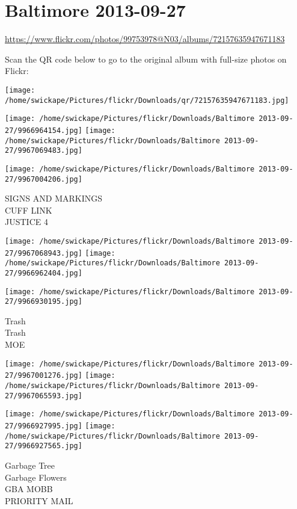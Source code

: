 \documentclass[10pt,letterpaper]{article}
\title{}
\author{}
\date{}
\begin{document}
\section*{Baltimore 2013-09-27}

\url{https://www.flickr.com/photos/99753978@N03/albums/72157635947671183}

Scan the QR code below to go to the original album with full-size photos on Flickr:

\texttt{[image: /home/swickape/Pictures/flickr/Downloads/qr/72157635947671183.jpg]}
\pagebreak

\texttt{[image: /home/swickape/Pictures/flickr/Downloads/Baltimore 2013-09-27/9966964154.jpg]}
\texttt{[image: /home/swickape/Pictures/flickr/Downloads/Baltimore 2013-09-27/9967069483.jpg]}

\vspace{0.25in}
\texttt{[image: /home/swickape/Pictures/flickr/Downloads/Baltimore 2013-09-27/9967004206.jpg]}

SIGNS AND MARKINGS\\
CUFF LINK\\
JUSTICE 4
\pagebreak

\texttt{[image: /home/swickape/Pictures/flickr/Downloads/Baltimore 2013-09-27/9967068943.jpg]}
\texttt{[image: /home/swickape/Pictures/flickr/Downloads/Baltimore 2013-09-27/9966962404.jpg]}

\vspace{0.25in}
\texttt{[image: /home/swickape/Pictures/flickr/Downloads/Baltimore 2013-09-27/9966930195.jpg]}

Trash\\
Trash\\
MOE
\pagebreak

\texttt{[image: /home/swickape/Pictures/flickr/Downloads/Baltimore 2013-09-27/9967001276.jpg]}
\texttt{[image: /home/swickape/Pictures/flickr/Downloads/Baltimore 2013-09-27/9967065593.jpg]}

\texttt{[image: /home/swickape/Pictures/flickr/Downloads/Baltimore 2013-09-27/9966927995.jpg]}
\texttt{[image: /home/swickape/Pictures/flickr/Downloads/Baltimore 2013-09-27/9966927565.jpg]}

Garbage Tree\\
Garbage Flowers\\
GBA MOBB\\
PRIORITY MAIL
\pagebreak
\end{document}
